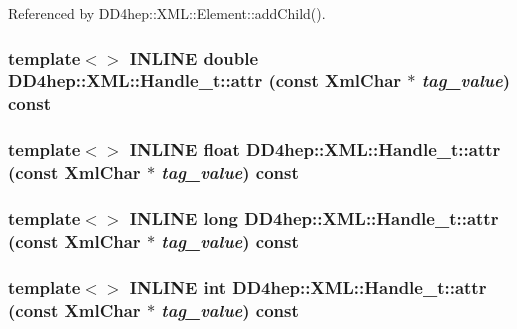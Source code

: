 Referenced by DD4hep::XML::Element::addChild().\hypertarget{class_d_d4hep_1_1_x_m_l_1_1_handle__t_af98ad78cd6aa7e536de9ddbf42d1fb46}{
\subsubsection[{attr}]{\setlength{\rightskip}{0pt plus 5cm}template$<$$>$ INLINE double DD4hep::XML::Handle\_\-t::attr (const {\bf XmlChar} $\ast$ {\em tag\_\-value}) const}}
\label{class_d_d4hep_1_1_x_m_l_1_1_handle__t_af98ad78cd6aa7e536de9ddbf42d1fb46}
\hypertarget{class_d_d4hep_1_1_x_m_l_1_1_handle__t_a7188282811aaefbdc1d455f4002ab1f6}{
\subsubsection[{attr}]{\setlength{\rightskip}{0pt plus 5cm}template$<$$>$ INLINE float DD4hep::XML::Handle\_\-t::attr (const {\bf XmlChar} $\ast$ {\em tag\_\-value}) const}}
\label{class_d_d4hep_1_1_x_m_l_1_1_handle__t_a7188282811aaefbdc1d455f4002ab1f6}
\hypertarget{class_d_d4hep_1_1_x_m_l_1_1_handle__t_a44872ce20d4d455c3a223f8c5ea35837}{
\subsubsection[{attr}]{\setlength{\rightskip}{0pt plus 5cm}template$<$$>$ INLINE long DD4hep::XML::Handle\_\-t::attr (const {\bf XmlChar} $\ast$ {\em tag\_\-value}) const}}
\label{class_d_d4hep_1_1_x_m_l_1_1_handle__t_a44872ce20d4d455c3a223f8c5ea35837}
\hypertarget{class_d_d4hep_1_1_x_m_l_1_1_handle__t_a7a07d45494000e6a516adba15fb377ee}{
\subsubsection[{attr}]{\setlength{\rightskip}{0pt plus 5cm}template$<$$>$ INLINE int DD4hep::XML::Handle\_\-t::attr (const {\bf XmlChar} $\ast$ {\em tag\_\-value}) const}}
